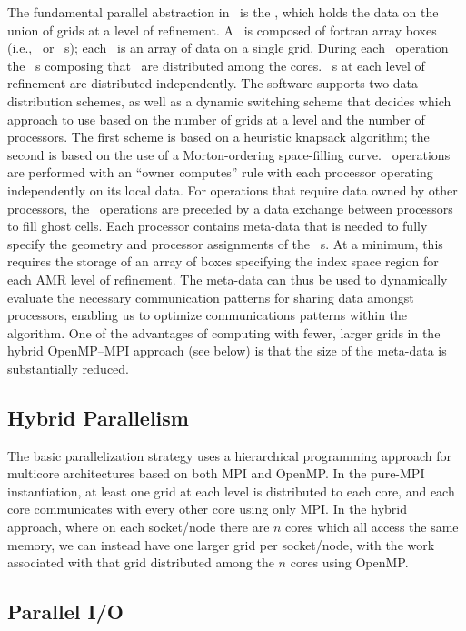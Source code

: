 The fundamental parallel abstraction in \BoxLib\ is the \MultiFab, which holds the data on the 
union of grids at a level of refinement.  A \MultiFab\ is composed of fortran array boxes 
(i.e., \FArrayBox\ or \Fab~s); each \Fab\ is an array of data on a single grid. 
During each \MultiFab\ operation the \Fab~s composing that \MultiFab\ are distributed 
among the cores.  \MultiFab~s at each level of refinement are distributed 
independently.  The software supports two data distribution schemes, as well as a 
dynamic switching scheme that decides which approach to use based on the number of 
grids at a level and the number of processors.  The first scheme is based on a 
heuristic knapsack algorithm; the second is based on the use of a Morton-ordering 
space-filling curve.  \MultiFab\ operations are performed with an ``owner computes'' rule 
with each processor operating independently on its local data.  For operations that 
require data owned by other processors, the \MultiFab\ operations are preceded by a 
data exchange between processors to fill ghost cells.  Each processor contains 
meta-data that is needed 
to fully specify the geometry and processor assignments of the \MultiFab~s. At a 
minimum, this requires the storage of an array of boxes specifying the index space 
region for each AMR level of refinement.  The meta-data can thus be used to 
dynamically evaluate the necessary communication patterns for sharing data amongst 
processors, enabling us to optimize communications patterns within the algorithm.
One of the advantages of computing with fewer, larger grids in the hybrid 
OpenMP--MPI approach (see below) is that the size of the meta-data is substantially 
reduced.

\subsection{Hybrid Parallelism}

The basic parallelization strategy uses a hierarchical programming approach for 
multicore architectures based on both MPI and OpenMP. In the pure-MPI instantiation, at 
least one grid at each level is distributed to each core, and each core communicates 
with every other core using only MPI.  In the hybrid approach, where on each socket/node 
there are $n$ cores which all access the same memory, we can instead have one larger 
grid per socket/node, with the work associated with that grid distributed among the $n$ 
cores using OpenMP.

\subsection{Parallel I/O}

